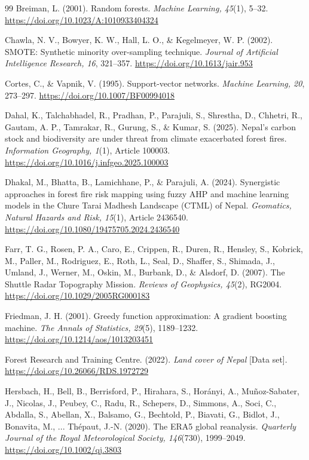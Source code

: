 \begin{thebibliography}{99}
Breiman, L. (2001). Random forests. \textit{Machine Learning, 45}(1), 5--32. \url{https://doi.org/10.1023/A:1010933404324}

Chawla, N. V., Bowyer, K. W., Hall, L. O., \& Kegelmeyer, W. P. (2002). SMOTE: Synthetic minority over-sampling technique. \textit{Journal of Artificial Intelligence Research, 16}, 321--357. \url{https://doi.org/10.1613/jair.953}

Cortes, C., \& Vapnik, V. (1995). Support-vector networks. \textit{Machine Learning, 20}, 273--297. \url{https://doi.org/10.1007/BF00994018}

Dahal, K., Talchabhadel, R., Pradhan, P., Parajuli, S., Shrestha, D., Chhetri, R., Gautam, A. P., Tamrakar, R., Gurung, S., \& Kumar, S. (2025). Nepal's carbon stock and biodiversity are under threat from climate exacerbated forest fires. \textit{Information Geography, 1}(1), Article 100003. \url{https://doi.org/10.1016/j.infgeo.2025.100003}

Dhakal, M., Bhatta, B., Lamichhane, P., \& Parajuli, A. (2024). Synergistic approaches in forest fire risk mapping using fuzzy AHP and machine learning models in the Chure Tarai Madhesh Landscape (CTML) of Nepal. \textit{Geomatics, Natural Hazards and Risk, 15}(1), Article 2436540. \url{https://doi.org/10.1080/19475705.2024.2436540}

Farr, T. G., Rosen, P. A., Caro, E., Crippen, R., Duren, R., Hensley, S., Kobrick, M., Paller, M., Rodriguez, E., Roth, L., Seal, D., Shaffer, S., Shimada, J., Umland, J., Werner, M., Oskin, M., Burbank, D., \& Alsdorf, D. (2007). The Shuttle Radar Topography Mission. \textit{Reviews of Geophysics, 45}(2), RG2004. \url{https://doi.org/10.1029/2005RG000183}

Friedman, J. H. (2001). Greedy function approximation: A gradient boosting machine. \textit{The Annals of Statistics, 29}(5), 1189--1232. \url{https://doi.org/10.1214/aos/1013203451}

Forest Research and Training Centre. (2022). \textit{Land cover of Nepal} [Data set]. \url{https://doi.org/10.26066/RDS.1972729}

Hersbach, H., Bell, B., Berrisford, P., Hirahara, S., Hor\'anyi, A., Mu\~noz-Sabater, J., Nicolas, J., Peubey, C., Radu, R., Schepers, D., Simmons, A., Soci, C., Abdalla, S., Abellan, X., Balsamo, G., Bechtold, P., Biavati, G., Bidlot, J., Bonavita, M., ... Th\'epaut, J.-N. (2020). The ERA5 global reanalysis. \textit{Quarterly Journal of the Royal Meteorological Society, 146}(730), 1999--2049. \url{https://doi.org/10.1002/qj.3803}


\end{thebibliography}
